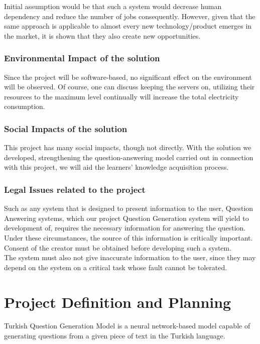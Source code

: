 \documentclass{mefsdp}
\begin{document}
	Initial assumption would be that such a system would decrease human dependency and reduce the number of jobs consequently. However, given that the same approach is applicable to almost every new technology/product emerges in the market, it is shown that they also create new opportunities. 
	
	
	\subsubsection{Environmental Impact of the solution}
	Since the project will be software-based, no significant effect on the environment will be observed. Of course, one can discuss keeping the servers on, utilizing their resources to the maximum level continually will increase the total electricity consumption. 
	
	\subsubsection{Social Impacts of the solution}
	This project has many social impacts, though not directly. With the solution we developed, strengthening the question-answering model carried out in connection with this project, we will aid the learners' knowledge acquisition process.
	
	
	\subsubsection{Legal Issues related to the project}
	Such as any system that is designed to present information to the user, Question Answering systems, which our project Question Generation system will yield to development of, requires the necessary information for answering the question. Under these circumstances, the source of this information is critically important. Consent of the creator must be obtained before developing such a system. \\
	
	The system must also not give inaccurate information to the user, since they may depend on the system on a critical task whose fault cannot be tolerated.
	
	\section{Project Definition and Planning}
	Turkish Question Generation Model is a neural network-based model capable of generating questions from a given piece of text in the Turkish language.
	
\end{document}
